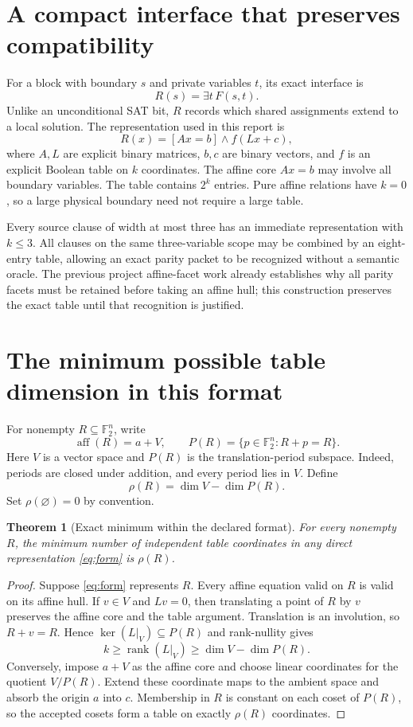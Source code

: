 \documentclass[11pt]{article}
\newtheorem{theorem}{Theorem}
\newcommand{\F}{\mathbb F_2}
\DeclareMathOperator{\aff}{aff}
\DeclareMathOperator{\rank}{rank}
\begin{document}
\section{A compact interface that preserves compatibility}
For a block with boundary $s$ and private variables $t$, its exact interface is
\[
 R(s)=\exists t\,F(s,t).
\]
Unlike an unconditional SAT bit, $R$ records which shared assignments extend to a
local solution. The representation used in this report is
\begin{equation}\label{eq:form}
 R(x)=[Ax=b]\land f(Lx+c),
\end{equation}
where $A,L$ are explicit binary matrices, $b,c$ are binary vectors, and $f$ is an
explicit Boolean table on $k$ coordinates. The affine core $Ax=b$ may involve all
boundary variables. The table contains $2^k$ entries. Pure affine relations have
$k=0$, so a large physical boundary need not require a large table.

Every source clause of width at most three has an immediate representation with
$k\le3$. All clauses on the same three-variable scope may be combined by an eight-entry
table, allowing an exact parity packet to be recognized without a semantic oracle.
The previous project affine-facet work already establishes why all parity facets
must be retained before taking an affine hull; this construction preserves the exact
table until that recognition is justified.

\section{The minimum possible table dimension in this format}
For nonempty $R\subseteq\F^n$, write
\[
 \aff(R)=a+V,\qquad
 P(R)=\{p\in\F^n:R+p=R\}.
\]
Here $V$ is a vector space and $P(R)$ is the translation-period subspace. Indeed,
periods are closed under addition, and every period lies in $V$. Define
\[
 \rho(R)=\dim V-\dim P(R).
\]
Set $\rho(\varnothing)=0$ by convention.

\begin{theorem}[Exact minimum within the declared format]\label{thm:min}
For every nonempty $R$, the minimum number of independent table coordinates in
any direct representation \eqref{eq:form} is $\rho(R)$.
\end{theorem}
\begin{proof}
Suppose \eqref{eq:form} represents $R$. Every affine equation valid on $R$ is valid
on its affine hull. If $v\in V$ and $Lv=0$, then translating a point of $R$ by $v$
preserves the affine core and the table argument. Translation is an involution, so
$R+v=R$. Hence $\ker(L|_V)\subseteq P(R)$ and rank-nullity gives
\[
 k\ge\rank(L|_V)\ge\dim V-\dim P(R).
\]
Conversely, impose $a+V$ as the affine core and choose linear coordinates for the
quotient $V/P(R)$. Extend these coordinate maps to the ambient space and absorb the
origin $a$ into $c$. Membership in $R$ is constant on each coset of $P(R)$, so the
accepted cosets form a table on exactly $\rho(R)$ coordinates.
\end{proof}
\end{document}
